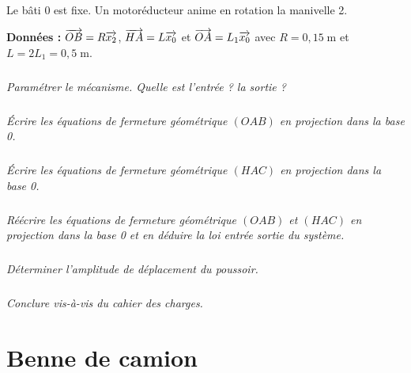 \documentclass[10pt]{article}
\newif\ifprof
\begin{document}
Le bâti 0 est fixe. Un motoréducteur anime en rotation la manivelle 2.


\textbf{Données : } $\overrightarrow{OB}=R\overrightarrow{x_2}$, $\overrightarrow{HA}=L\overrightarrow{x_0}$ et $\overrightarrow{OA}=L_1\overrightarrow{x_0}$ avec $R=0,15 \;\text{m}$ et $L=2L_1=0,5\; \text{m}$.


\subparagraph{}
\textit{Paramétrer le mécanisme. Quelle est l'entrée ? la sortie ?}
\ifprof
\begin{corrige}
\end{corrige}
\else
\fi

\subparagraph{}
\textit{Écrire les équations de fermeture géométrique $(OAB)$ en projection dans la base 0. }
\ifprof
\begin{corrige}
\end{corrige}
\else
\fi

\subparagraph{}
\textit{Écrire les équations de fermeture géométrique $(HAC)$ en projection dans la base 0. }
\ifprof
\begin{corrige}
\end{corrige}
\else
\fi

\subparagraph{}
\textit{Réécrire les équations de fermeture géométrique $(OAB)$ et $(HAC)$ en projection dans la base 0 et en déduire la loi entrée sortie du système. }
\ifprof
\begin{corrige}
\end{corrige}
\else
\fi

\subparagraph{}
\textit{Déterminer l'amplitude de déplacement du poussoir.}
\ifprof
\begin{corrige}
\end{corrige}
\else
\fi


\subparagraph{}
\textit{Conclure vis-à-vis du cahier des charges.}
\ifprof
\begin{corrige}
\end{corrige}
\else
\fi


\section*{Benne de camion}
\setcounter{subparagraph}{0}
\end{document}
